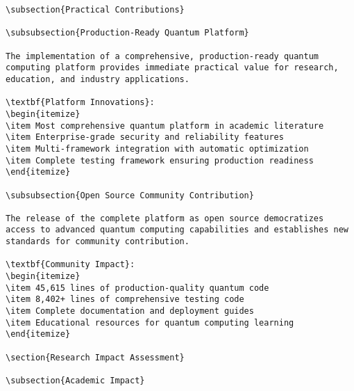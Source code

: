 \documentclass[12pt,a4paper]{report}
\begin{document}
\begin{lstlisting}
\subsection{Practical Contributions}

\subsubsection{Production-Ready Quantum Platform}

The implementation of a comprehensive, production-ready quantum computing platform provides immediate practical value for research, education, and industry applications.

\textbf{Platform Innovations}:
\begin{itemize}
\item Most comprehensive quantum platform in academic literature
\item Enterprise-grade security and reliability features
\item Multi-framework integration with automatic optimization
\item Complete testing framework ensuring production readiness
\end{itemize}

\subsubsection{Open Source Community Contribution}

The release of the complete platform as open source democratizes access to advanced quantum computing capabilities and establishes new standards for community contribution.

\textbf{Community Impact}:
\begin{itemize}
\item 45,615 lines of production-quality quantum code
\item 8,402+ lines of comprehensive testing code
\item Complete documentation and deployment guides
\item Educational resources for quantum computing learning
\end{itemize}

\section{Research Impact Assessment}

\subsection{Academic Impact}


\end{lstlisting}
\end{document}

